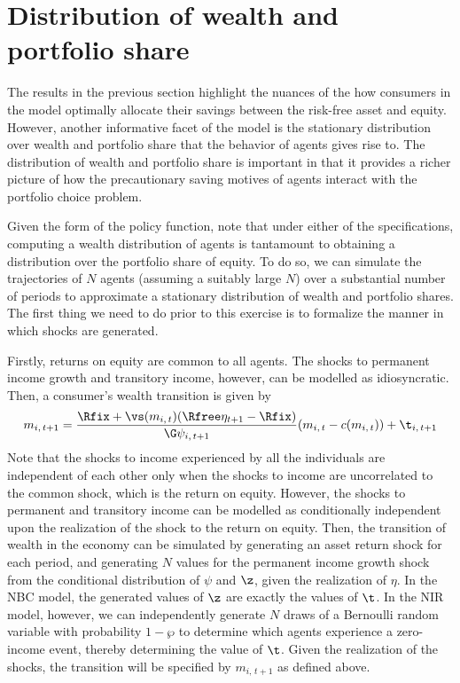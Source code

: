 \section{Distribution of wealth and portfolio share}

The results in the previous section highlight the nuances of the how consumers in the model optimally allocate their savings between the risk-free asset and equity. However, another informative facet of the model is the stationary distribution over wealth and portfolio share that the behavior of agents gives rise to. The distribution of wealth and portfolio share is important in that it provides a richer picture of how the precautionary saving motives of agents interact with the portfolio choice problem.

Given the form of the policy function, note that under either of the specifications, computing a wealth distribution of agents is tantamount to obtaining a distribution over the portfolio share of equity. To do so, we can simulate the trajectories of $N$ agents (assuming a suitably large $N$) over a substantial number of periods to approximate a stationary distribution of wealth and portfolio shares. The first thing we need to do prior to this exercise is to formalize the manner in which shocks are generated.

Firstly, returns on equity are common to all agents. The shocks to permanent income growth and transitory income, however, can be modelled as idiosyncratic. Then, a consumer's wealth transition is given by
\[
m_{i,\,t+1} = \frac{\Rfix + \vs(m_{i,\,t})(\Rfree\eta_{t+1} - \Rfix)}{\G\psi_{i,\,t+1}}(m_{i,\,t} - c(m_{i,\,t})) + \t_{i,\,t+1}
\]
Note that the shocks to income experienced by all the individuals are independent of each other only when the shocks to income are uncorrelated to the common shock, which is the return on equity. However, the shocks to permanent and transitory income can be modelled as conditionally independent upon the realization of the shock to the return on equity. Then, the transition of wealth in the economy can be simulated by generating an asset return shock for each period, and generating $N$ values for the permanent income growth shock from the conditional distribution of $\psi$ and $\z$, given the realization of $\eta$. In the NBC model, the generated values of $\z$ are exactly the values of $\t$. In the NIR model, however, we can independently generate $N$ draws of a Bernoulli random variable with probability $1 - \wp$ to determine which agents experience a zero-income event, thereby determining the value of $\t$. Given the realization of the shocks, the transition will be specified by $m_{i,\,t+1}$ as defined above.

